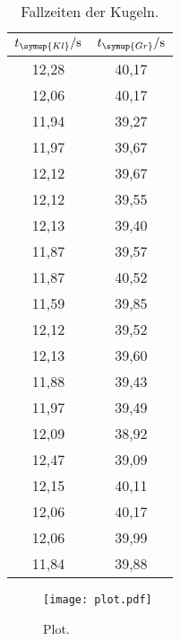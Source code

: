 \begin{table}
  \centering
  \caption{Fallzeiten der Kugeln.}
  \label{tab:Fallzeit}
  \begin{tabular}{c c}
    \toprule
    $t_{\symup{Kl}}/\unit{\second} $ & $t_{\symup{Gr}}/\unit{\second}$ \\
    \midrule
    12,28 & 40,17 \\
    12,06 & 40,17 \\
    11,94 & 39,27 \\
    11,97 & 39,67 \\
    12,12 & 39,67 \\
    12,12 & 39,55 \\
    12,13 & 39,40 \\
    11,87 & 39,57 \\
    11,87 & 40,52 \\
    11,59 & 39,85 \\
    12,12 & 39,52 \\
    12,13 & 39,60 \\
    11,88 & 39,43 \\
    11,97 & 39,49 \\
    12,09 & 38,92 \\
    12,47 & 39,09 \\
    12,15 & 40,11 \\
    12,06 & 40,17 \\
    12,06 & 39,99 \\
    11,84 & 39,88 \\
    \bottomrule
  \end{tabular}
\end{table}

\begin{figure}
  \centering
  \texttt{[image: plot.pdf]}
  \caption{Plot.}
  \label{fig:plot}
\end{figure}